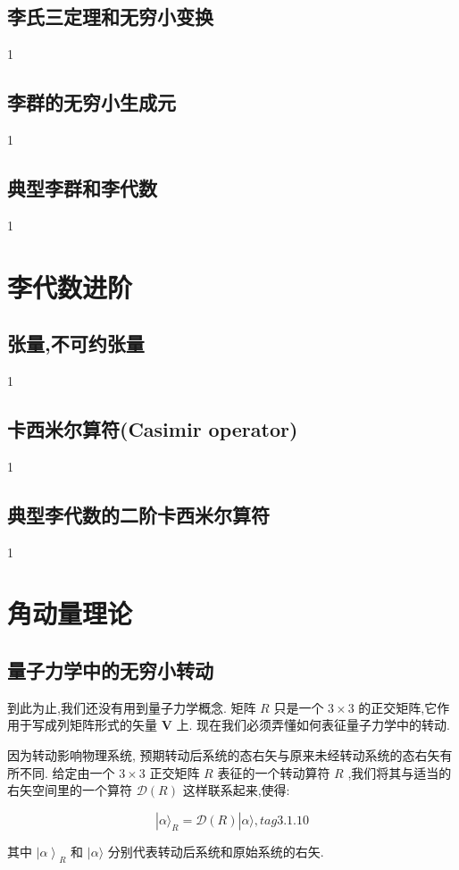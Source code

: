 \subsection{李氏三定理和无穷小变换}
1
\subsection{李群的无穷小生成元}
1
\subsection{典型李群和李代数}
1
\section{李代数进阶}
\subsection{张量,不可约张量}
1
\subsection{卡西米尔算符(Casimir operator)}
1
\subsection{典型李代数的二阶卡西米尔算符}
1


\section{角动量理论}
\subsection{量子力学中的无穷小转动} 

到此为止,我们还没有用到量子力学概念. 矩阵 $R$ 只是一个 $3 \times 3$ 的正交矩阵,它作用于写成列矩阵形式的矢量 $\mathbf{V}$ 上. 现在我们必须弄懂如何表征量子力学中的转动.

因为转动影响物理系统, 预期转动后系统的态右矢与原来未经转动系统的态右矢有所不同. 给定由一个 $3 \times 3$ 正交矩阵 $R$ 表征的一个转动算符 $R$ ,我们将其与适当的右矢空间里的一个算符 $\mathcal{D}\left( R\right)$ 这样联系起来,使得:

$$
|\alpha {\rangle }_{R} = \mathcal{D}\left( R\right) |\alpha \rangle , tag{3.1.10}
$$

其中 ${\left| \alpha \right\rangle }_{R}$ 和 $|\alpha \rangle$ 分别代表转动后系统和原始系统的右矢. 

